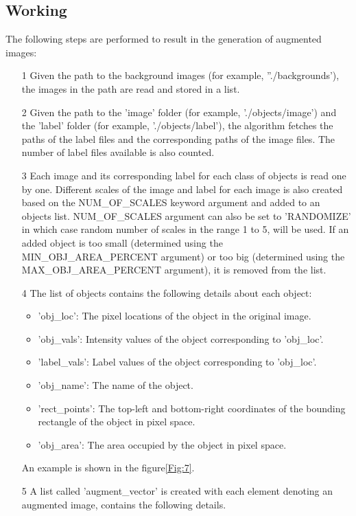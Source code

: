 \documentclass[paper=a4,11pt,parskip=half,toc=listof]{scrartcl}
\begin{document}
\subsection{Working}
The following steps are performed to result in the generation of augmented images:
	\begin{itemize}
	\label{List:1}
		\item[1] Given the path to the background images (for example, ''./backgrounds'), the images in the path are read and stored in a list.
		\item[2] Given the path to the 'image' folder (for example, './objects/image') and the 'label' folder (for example, './objects/label'), the algorithm fetches the paths of the label files and the corresponding paths of the image files. The number of label files available is also counted.
		\item[3] Each image and its corresponding label for each class of objects is read one by one. Different scales of the image and label for each image is also created based on the NUM\_OF\_SCALES keyword argument and added to an objects list. NUM\_OF\_SCALES argument can also be set to 'RANDOMIZE' in which case random number of scales in the range 1 to 5, will be used. If an added object is too small (determined using the MIN\_OBJ\_AREA\_PERCENT argument) or too big (determined using the MAX\_OBJ\_AREA\_PERCENT argument), it is removed from the list.
		\item[4] The list of objects contains the following details about each object:
			\begin{itemize}
				\item 'obj\_loc': The pixel locations of the object in the original image.
				\item 'obj\_vals': Intensity values of the object corresponding to 'obj\_loc'.
				\item 'label\_vals': Label values of the object corresponding to 'obj\_loc'.
				\item 'obj\_name': The name of the object.
				\item 'rect\_points': The top-left and bottom-right coordinates of the bounding rectangle of the object in pixel space.
				\item 'obj\_area': The area occupied by the object in pixel space.
			\end{itemize}
		An example is shown in the figure\ref{Fig:7}.
		\item[5] A list called 'augment\_vector' is created with each element denoting an augmented image, contains the following details.

\end{itemize}
\end{document}
